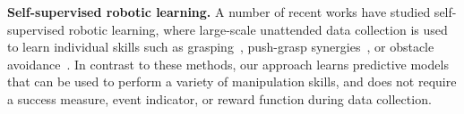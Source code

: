 
\noindent \textbf{Self-supervised robotic learning.}
A number of recent works have studied self-supervised robotic learning, where large-scale unattended data collection is used to learn individual skills such as grasping~\cite{mottaghi2016happens, lerrel,google_handeye, calandra2017feeling,pinto2016curious}, push-grasp synergies~\cite{zeng2018learning}, or obstacle avoidance~\cite{greg_kahn_uncertainty,crashing}. 
In contrast to these methods, our approach learns predictive models that can be used to perform a variety of manipulation skills, and does not require a success measure, event indicator, or reward function during data collection.

